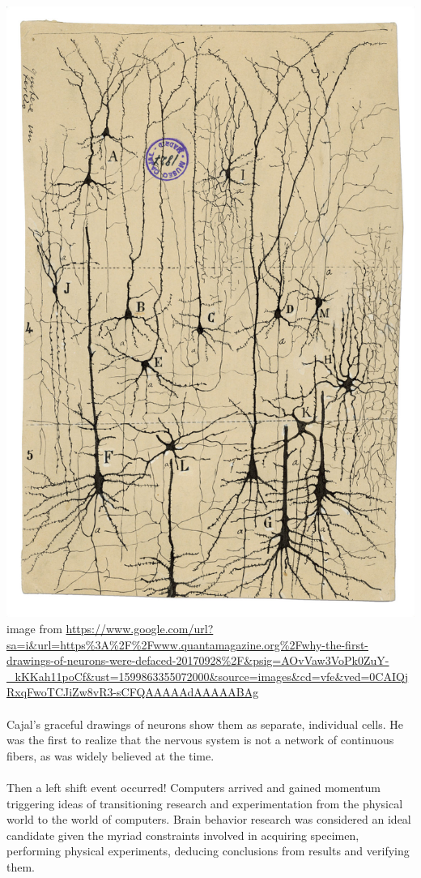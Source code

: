 \documentclass[12pt,a4paper]{article}
\begin{document}
\includegraphics[scale=0.3]{cajal-neuron-drawing.jpg}\newline
image from \url{https://www.google.com/url?sa=i&url=https%3A%2F%2Fwww.quantamagazine.org%2Fwhy-the-first-drawings-of-neurons-were-defaced-20170928%2F&psig=AOvVaw3VoPk0ZuY-_kKKah11poCf&ust=1599863355072000&source=images&cd=vfe&ved=0CAIQjRxqFwoTCJiZw8vR3-sCFQAAAAAdAAAAABAg}
\paragraph{}
Cajal’s graceful drawings of neurons show them as separate, individual cells. He was the first to realize that the nervous system is not a network of continuous fibers, as was widely believed at the time.
\paragraph{}
Then a left shift event occurred! Computers arrived and gained momentum triggering ideas of transitioning research and experimentation from the physical world to the world of computers. Brain behavior research was considered an ideal candidate given the myriad constraints involved in acquiring specimen, performing physical experiments, deducing conclusions from results and verifying them.
\end{document}
